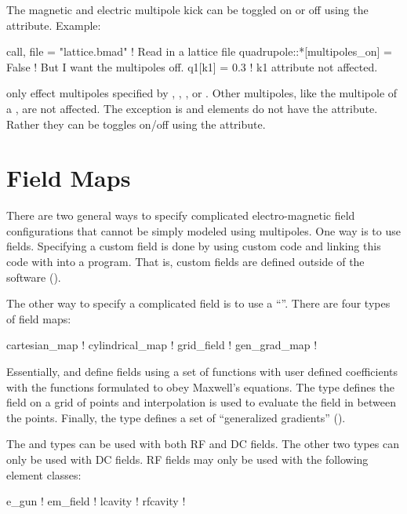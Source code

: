 The magnetic and electric multipole kick can be toggled on or off using the
 attribute. Example:
\begin{example}
  call, file = "lattice.bmad"             ! Read in a lattice file
  quadrupole::*[multipoles_on] = False    ! But I want the multipoles off.
  q1[k1] = 0.3                            ! k1 attribute not affected.
\end{example}
 only effect multipoles specified by , , , or
. Other multipoles, like the  multipole of a , are not
affected. The exception is  and  elements do not have the
 attribute. Rather they can be toggles on/off using the 
attribute.

\section{Field Maps}
\label{s:fieldmap}

There are two general ways to specify complicated electro-magnetic field configurations
that cannot be simply modeled using multipoles. One way is to use 
fields. Specifying a custom field is done by using custom code and linking this code with
\bmad into a program. That is, custom fields are defined outside of the \bmad software
().

The other way to specify a complicated field is to use a ``''. There
are four types of field maps:
\begin{example}
  cartesian_map       ! 
  cylindrical_map     ! 
  grid_field          ! 
  gen_grad_map        ! 
\end{example}
Essentially,  and  define fields using a set of
functions with user defined coefficients with the functions formulated to obey Maxwell's
equations. The  type defines the field on a grid of points and
interpolation is used to evaluate the field in between the points. Finally, the
 type defines a set of ``generalized gradients'' ().

The  and  types can be used with both RF and DC fields.
The other two types can only be used with DC fields. RF fields may only be used with the following
element classes:
\begin{example}
  e_gun         ! 
  em_field      ! 
  lcavity       ! 
  rfcavity      ! 
\end{example}

